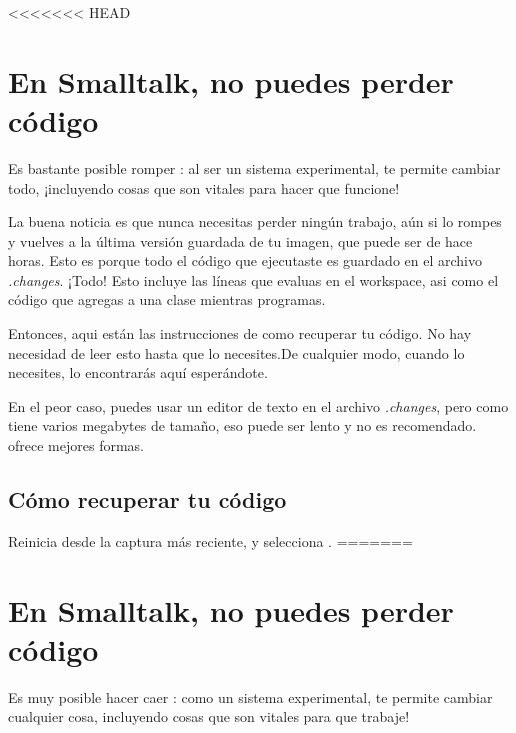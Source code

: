 \documentclass[spanish,a4paper,10pt,twoside]{book}
\begin{document}
<<<<<<< HEAD
\section{En Smalltalk, no puedes perder c\'odigo}

Es bastante posible romper \pharo: al ser un sistema experimental, \pharo te
permite cambiar todo, ¡incluyendo cosas que son vitales para hacer que \pharo funcione!


La buena noticia es que nunca necesitas perder ning\'un trabajo, a\'un si lo
rompes y vuelves a la \'ultima versi\'on guardada de tu imagen, que puede ser de
hace horas. Esto es porque todo el c\'odigo que ejecutaste es guardado en el
archivo \emph{.changes}. ¡Todo! Esto incluye las l\'ineas que evaluas en el
workspace, asi como el c\'odigo que agregas a una clase mientras programas.


Entonces, aqui est\'an las instrucciones de como recuperar tu c\'odigo. No hay
necesidad de leer esto hasta que lo necesites.De cualquier modo, cuando lo
necesites, lo encontrar\'as aqu\'i esper\'andote.

En el peor caso, puedes usar un editor de texto en el archivo \emph{.changes},
pero como tiene varios megabytes de tamaño, eso puede ser lento y no es
recomendado. \pharo ofrece mejores formas.

\subsection{C\'omo recuperar tu c\'odigo}
Reinicia \pharo desde la captura más reciente, y selecciona
.
=======
\section{En Smalltalk, no puedes perder c\'odigo}

Es muy posible hacer caer \pharo: como un sistema experimental, \pharo te permite cambiar cualquier cosa, incluyendo cosas que son vitales para que \pharo trabaje!

\end{document}
